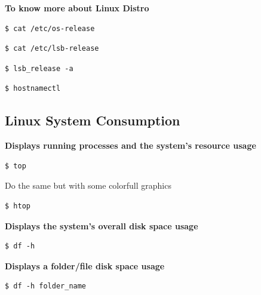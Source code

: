 \documentclass{article}
\newenvironment{codetemplate}[1][]{%
  \mybasecolorbox[#1]
  \itshape
}{%
  \endmybasecolorbox
}
\begin{document}
\textbf{To know more about Linux Distro}
\begin{codetemplate}{}
\begin{verbatim}
$ cat /etc/os-release
\end{verbatim}
\end{codetemplate}
\begin{codetemplate}{}
\begin{verbatim}
$ cat /etc/lsb-release
\end{verbatim}
\end{codetemplate}
\begin{codetemplate}{}
\begin{verbatim}
$ lsb_release -a
\end{verbatim}
\end{codetemplate}
\begin{codetemplate}{}
\begin{verbatim}
$ hostnamectl
\end{verbatim}
\end{codetemplate}

\subsection{Linux System Consumption}
\textbf{Displays running processes and the system’s resource usage}
\begin{codetemplate}{}
\begin{verbatim}
$ top
\end{verbatim}
\end{codetemplate}

Do the same but with some colorfull graphics
\begin{codetemplate}{}
\begin{verbatim}
$ htop
\end{verbatim}
\end{codetemplate}

\textbf{Displays the system’s overall disk space usage}
\begin{codetemplate}{}
\begin{verbatim}
$ df -h
\end{verbatim}
\end{codetemplate}

\textbf{Displays a folder/file disk space usage}
\begin{codetemplate}{}
\begin{verbatim}
$ df -h folder_name
\end{verbatim}
\end{codetemplate}
\end{document}
